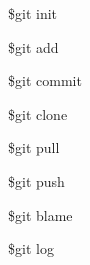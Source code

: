 \documentclass{beamer}
\begin{document}
\begin{frame}{\$git init}

\end{frame}

\begin{frame}{\$git add}
\end{frame}

\begin{frame}{\$git commit}
\end{frame}

\begin{frame}{\$git clone}
\end{frame}

\begin{frame}{\$git pull}
\end{frame}

\begin{frame}{\$git push}
\end{frame}

\begin{frame}{\$git blame}
\end{frame}

\begin{frame}{\$git log}
\end{frame}
\end{document}
